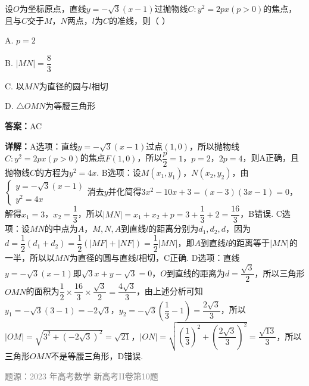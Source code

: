 \begin{question}
设$O$为坐标原点，直线$y=-\sqrt{3}(x-1)$过抛物线$C:y^{2}=2px(p>0)$的焦点，且与$C$交于$M$，$N$两点，$l$为$C$的准线，则（ \quad ）
\begin{choices}
\item A. $p=2$
\item B. $|MN|=\dfrac{8}{3}$
\item C. 以$MN$为直径的圆与$l$相切
\item D. $\triangle OMN$为等腰三角形
\end{choices}
\begin{solution}
\textbf{答案：}AC

\textbf{详解：}A选项：直线$y=-\sqrt{3}(x-1)$过点$(1,0)$，所以抛物线$C:y^{2}=2px(p>0)$的焦点$F(1,0)$，所以$\dfrac{p}{2}=1$，$p=2$，$2p=4$，则A正确，且抛物线$C$的方程为$y^{2}=4x$.
B选项：设$M(x_{1},y_{1})$，$N(x_{2},y_{2})$，由$\begin{cases}y=-\sqrt{3}(x-1)\\ y^{2}=4x\end{cases}$消去$y$并化简得$3x^{2}-10x+3=(x-3)(3x-1)=0$，解得$x_{1}=3$，$x_{2}=\dfrac{1}{3}$，所以$|MN|=x_{1}+x_{2}+p=3+\dfrac{1}{3}+2=\dfrac{16}{3}$，B错误.
C选项：设$MN$的中点为$A$，$M,N,A$到直线$l$的距离分别为$d_{1},d_{2},d$，因为$d=\dfrac{1}{2}(d_{1}+d_{2})=\dfrac{1}{2}(|MF|+|NF|)=\dfrac{1}{2}|MN|$，即$A$到直线$l$的距离等于$|MN|$的一半，所以以$MN$为直径的圆与直线$l$相切，C正确.
D选项：直线$y=-\sqrt{3}(x-1)$即$\sqrt{3}x+y-\sqrt{3}=0$，$O$到直线的距离为$d=\dfrac{\sqrt{3}}{2}$，所以三角形$OMN$的面积为$\dfrac{1}{2}\times\dfrac{16}{3}\times\dfrac{\sqrt{3}}{2}=\dfrac{4\sqrt{3}}{3}$，由上述分析可知$y_{1}=-\sqrt{3}(3-1)=-2\sqrt{3}$，$y_{2}=-\sqrt{3}\left(\dfrac{1}{3}-1\right)=\dfrac{2\sqrt{3}}{3}$，所以$|OM|=\sqrt{3^{2}+(-2\sqrt{3})^{2}}=\sqrt{21}$，$|ON|=\sqrt{\left(\dfrac{1}{3}\right)^{2}+\left(\dfrac{2\sqrt{3}}{3}\right)^{2}}=\dfrac{\sqrt{13}}{3}$，所以三角形$OMN$不是等腰三角形，D错误.

\textcolor{gray}{\footnotesize 题源：2023 年高考数学 新高考II卷第10题}
\end{solution}
\end{question}

